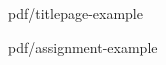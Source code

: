 \documentclass[%
  12pt,       				%
  a4paper,    				%
	twoside,      			%
	unicode,						%
]{report}				    	%
\begin{document}
\pagestyle{empty}      %


  {pdf/titlepage-example}%
\oddpage%
   
  {pdf/assignment-example}%
\oddpage%

\makeabstract

\makedeclaration

\makeacknowledgement

\tableofcontents

\listoffigures

\listoftables

\lstlistoflistings

\cleardoublepage\pagestyle{plain}   %
\end{document}

